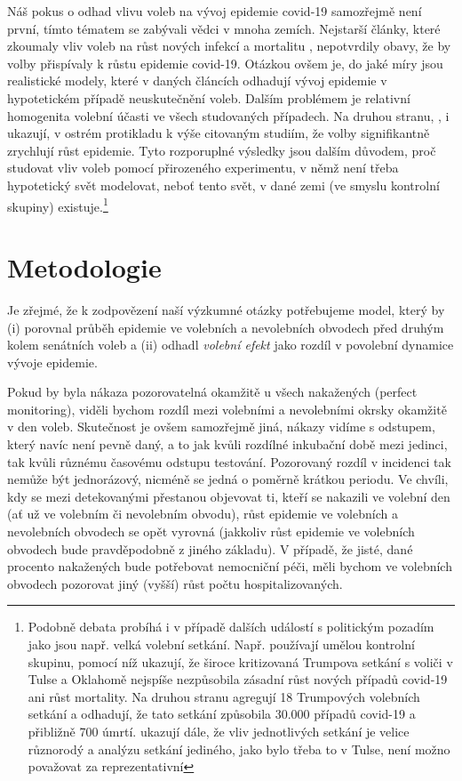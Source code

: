 Náš pokus o odhad vlivu voleb na vývoj epidemie covid-19 samozřejmě není první, tímto tématem se zabývali vědci v mnoha zemích. Nejstarší články, které zkoumaly vliv voleb na růst nových infekcí a mortalitu \cite{Berry2020, feltham2020no, AJPH2020}, nepotvrdily obavy, že by volby přispívaly k růstu epidemie covid-19. Otázkou ovšem je, do jaké míry jsou realistické modely, které v daných článcích odhadují vývoj epidemie v hypotetickém případě neuskutečnění voleb. Dalším problémem je relativní homogenita volební účasti ve všech studovaných případech. Na druhou stranu, 
\cite{bertoli_france}, \cite{cotti2020relationship} i \cite{Cassan2020} 
ukazují, v ostrém protikladu k výše citovaným studiím, že volby signifikantně zrychlují růst epidemie. Tyto rozporuplné výsledky jsou dalším důvodem, proč studovat vliv voleb pomocí přirozeného experimentu, v němž není třeba hypotetický svět  modelovat, neboť tento svět, v dané zemi (ve smyslu kontrolní skupiny) existuje.\footnote{Podobně debata probíhá i v případě dalších událostí s politickým pozadím jako jsou např. velká volební setkání. Např. \cite{dave2020risk} používají umělou kontrolní skupinu, pomocí níž ukazují, že široce kritizovaná Trumpova setkání s voliči v Tulse a Oklahomě nejspíše nezpůsobila zásadní růst nových případů covid-19 ani růst mortality. Na druhou stranu  \cite{bernheim2020effects} agregují 18 Trumpových volebních setkání a odhadují, že tato setkání způsobila 30.000 případů covid-19 a přibližně 700 úmrtí.  \cite{bernheim2020effects} ukazují dále, že vliv jednotlivých setkání je velice různorodý a analýzu setkání jediného, jako bylo třeba to v Tulse, není možno považovat za reprezentativní}


\section*{Metodologie}
Je zřejmé, že k zodpovězení naší výzkumné otázky potřebujeme model, který by (i) porovnal průběh epidemie ve volebních a nevolebních obvodech před druhým kolem senátních voleb a (ii) odhadl {\it volební efekt} jako rozdíl v povolební dynamice vývoje epidemie.

Pokud by byla nákaza pozorovatelná okamžitě u všech nakažených (perfect monitoring), viděli bychom rozdíl mezi volebními a nevolebními okrsky okamžitě v den voleb. Skutečnost je ovšem samozřejmě jiná, nákazy vidíme s odstupem, který navíc není pevně daný, a to jak kvůli rozdílné inkubační době mezi jedinci, tak kvůli různému časovému odstupu testování. Pozorovaný rozdíl v incidenci tak nemůže být jednorázový, nicméně se jedná o poměrně krátkou periodu. Ve chvíli, kdy se mezi detekovanými přestanou objevovat ti, kteří se nakazili ve volební den (ať už ve volebním či nevolebním obvodu), růst epidemie ve volebních a nevolebních obvodech se opět vyrovná (jakkoliv růst epidemie ve volebních obvodech bude pravděpodobně z jiného základu). V případě, že jisté, dané procento nakažených bude potřebovat nemocniční péči, měli bychom ve volebních obvodech pozorovat jiný (vyšší) růst počtu hospitalizovaných.  

